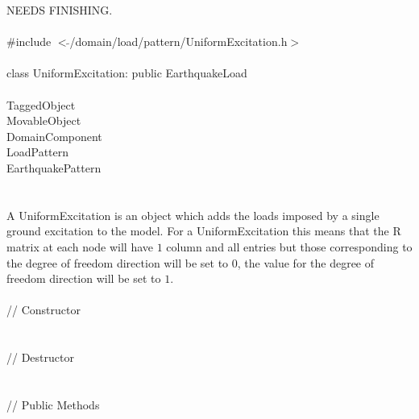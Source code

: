 
NEEDS FINISHING. \\

   \\
\indent \#include $<\tilde{ }$/domain/load/pattern/UniformExcitation.h$>$  \\

  \\
\indent class UniformExcitation: public EarthquakeLoad  \\

 \\
\indent TaggedObject \\
\indent MovableObject \\
\indent\indent DomainComponent \\
\indent\indent\indent LoadPattern \\
\indent\indent\indent\indent EarthquakePattern \\
\indent\indent\indent{} \\

 \\ 
\indent A UniformExcitation is an object which adds the loads imposed
by a single ground excitation to the model. For a UniformExcitation
this means that the \p R matrix at each node will have $1$ column
and all entries but those corresponding to the degree of freedom
direction will be set to $0$, the value for the degree of freedom
direction will be set to $1$.\\

 \\
\indent // Constructor \\ 
\\ \\
\indent // Destructor \\ 
\\  \\
\indent // Public Methods \\ 
 \\ 
\\
\\
\\

